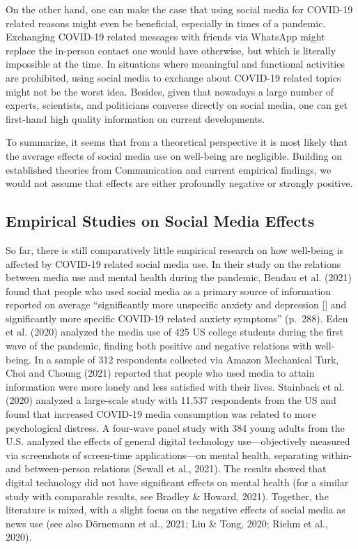 \documentclass[
  man,mask]{apa7}
\begin{document}
On the other hand, one can make the case that using social media for COVID-19 related reasons might even be beneficial, especially in times of a pandemic.
Exchanging COVID-19 related messages with friends via WhatsApp might replace the in-person contact one would have otherwise, but which is literally impossible at the time.
In situations where meaningful and functional activities are prohibited, using social media to exchange about COVID-19 related topics might not be the worst idea.
Besides, given that nowadays a large number of experts, scientists, and politicians converse directly on social media, one can get first-hand high quality information on current developments.

To summarize, it seems that from a theoretical perspective it is most likely that the average effects of social media use on well-being are negligible.
Building on established theories from Communication and current empirical findings, we would not assume that effects are either profoundly negative or strongly positive.

\hypertarget{empirical-studies-on-social-media-effects}{%
\subsection{Empirical Studies on Social Media Effects}\label{empirical-studies-on-social-media-effects}}

So far, there is still comparatively little empirical research on how well-being is affected by COVID-19 related social media use.
In their study on the relations between media use and mental health during the pandemic, Bendau et al. (2021) found that people who used social media as a primary source of information reported on average ``significantly more unspecific anxiety and depression {[}{]} and significantly more specific COVID-19 related anxiety symptoms'' (p.~288).
Eden et al. (2020) analyzed the media use of 425 US college students during the first wave of the pandemic, finding both positive and negative relations with well-being.
In a sample of 312 respondents collected via Amazon Mechanical Turk, Choi and Choung (2021) reported that people who used media to attain information were more lonely and less satisfied with their lives.
Stainback et al. (2020) analyzed a large-scale study with 11,537 respondents from the US and found that increased COVID-19 media consumption was related to more psychological distress.
A four-wave panel study with 384 young adults from the U.S. analyzed the effects of general digital technology use---objectively measured via screenshots of screen-time applications---on mental health, separating within- and between-person relations (Sewall et al., 2021).
The results showed that digital technology did not have significant effects on mental health (for a similar study with comparable results, see Bradley \& Howard, 2021).
Together, the literature is mixed, with a slight focus on the negative effects of social media as news use (see also Dörnemann et al., 2021; Liu \& Tong, 2020; Riehm et al., 2020).
\end{document}
